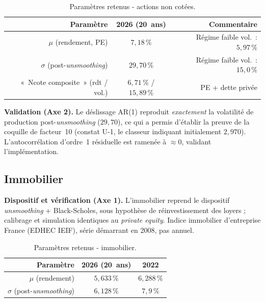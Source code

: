 \documentclass[11pt,a4paper]{article}
\renewcommand{\arraystretch}{1.4}
\newcommand{\tablehead}[1]{\textcolor{nxnavy}{\sffamily\bfseries\small #1}}
\begin{document}
\begin{table}[H]
\centering\small
\renewcommand{\arraystretch}{1.4}\setlength{\tabcolsep}{6pt}
\begin{tabularx}{\linewidth}{R C R}
\toprule
\tablehead{Paramètre} & \tablehead{2026 (20~ans)} & \tablehead{Commentaire} \\
\midrule
{} $\mu$ (rendement, PE) & $7{,}18\,\%$ & Régime faible vol.~: $5{,}97\,\%$ \\
$\sigma$ (post-\emph{unsmoothing}) & $29{,}70\,\%$ & Régime faible vol.~: $15{,}0\,\%$ \\
 «~Ncote composite~» (rdt / vol.) & $6{,}71\,\%$ / $15{,}89\,\%$ & PE + dette privée \\
\bottomrule
\end{tabularx}
\caption{Paramètres retenus - actions non cotées.}
\end{table}

\textbf{Validation (Axe 2).} Le déslissage AR(1) reproduit \emph{exactement} la volatilité de production post-\emph{unsmoothing} ($29{,}70$), ce qui a permis d'établir la preuve de la coquille de facteur~10 (constat U-1, le classeur indiquant initialement $2{,}970$). L'autocorrélation d'ordre~1 résiduelle est ramenée à $\approx0$, validant l'implémentation.

\subsection{Immobilier}

\textbf{Dispositif et vérification (Axe 1).} L'immobilier reprend le dispositif \emph{unsmoothing} + Black-Scholes, sous hypothèse de réinvestissement des loyers ; calibrage et simulation identiques au \emph{private equity}. Indice immobilier d'entreprise France (EDHEC IEIF), série démarrant en 2008, pas annuel.

\begin{table}[H]
\centering\small
\renewcommand{\arraystretch}{1.4}\setlength{\tabcolsep}{6pt}
\begin{tabularx}{\linewidth}{R C C}
\toprule
\tablehead{Paramètre} & \tablehead{2026 (20~ans)} & \tablehead{2022} \\
\midrule
{} $\mu$ (rendement) & $5{,}633\,\%$ & $6{,}288\,\%$ \\
$\sigma$ (post-\emph{unsmoothing}) & $6{,}128\,\%$ & $7{,}9\,\%$ \\
\bottomrule
\end{tabularx}
\caption{Paramètres retenus - immobilier.}
\end{table}
\end{document}
